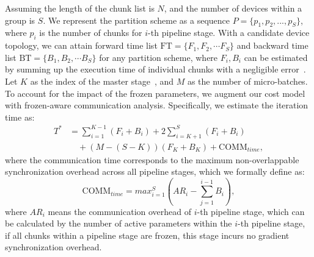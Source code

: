 \documentclass[conference]{IEEEtran}
\begin{document}
Assuming the length of the chunk list is $N$, and the number of devices within a group is $S$.
We represent the partition scheme as a sequence $P=\{p_1,p_2, ..., p_S\}$, where $p_i$ is the number of chunks for $i$-th pipeline stage. 
With a candidate device topology, we can attain forward time list $\text{FT} = \{F_1, F_2, \cdots F_S\}$ and backward time list $\text{BT} = \{B_1, B_2, \cdots B_S\}$ for any partition scheme, where $F_i, B_i$ can be estimated by summing up the execution time of individual chunks with a negligible error~\cite{um2024metis}.
Let \( K \) as the index of the master stage~\cite{liu2022autopipe}, and $M$ as the number of micro-batches. 
To account for the impact of the frozen parameters, we augment our cost model with frozen-aware communication analysis. 
Specifically, we estimate the iteration time as:
\vspace{-1mm}
\begin{equation}
\begin{split}
T^* &= \sum_{i = 1}^{K - 1}({F_i+B_i})+2 \sum_{i=K+1}^S(F_i+B_i) \\
    &\quad + (M - (S - K))(F_K + B_K) + \text{COMM}_{time},
\end{split}
\end{equation}
where the communication time corresponds to the maximum non-overlappable synchronization overhead across all pipeline stages, which we formally define as:
\begin{equation}
\text{COMM}_{time} = max_{i=1}^{S} (AR_i - \sum_{j=1}^{i - 1} B_i),
\end{equation}
where $AR_i$ means the communication overhead of $i$-th pipeline stage, which can be calculated by the number of active parameters within the $i$-th pipeline stage, if all chunks within a pipeline stage are frozen, this stage incurs no gradient synchronization overhead.
\end{document}
